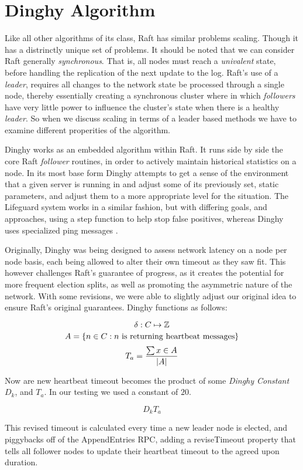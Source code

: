 \section{Dinghy Algorithm}

Like all other algorithms of its class, Raft has similar problems scaling. Though it has a distrinctly unique set of problems. It should be noted that we can consider Raft generally \textit{synchronous}. That is, all nodes must reach a \textit{univalent} state, before handling the replication of the next update to the log. Raft's use of a \textit{leader}, requires all changes to the network state be processed through a single node, thereby essentially creating a synchronous cluster where in which \textit{followers} have very little power to influence the cluster's state when there is a healthy \textit{leader}. So when we discuss scaling in terms of a leader based methods we have to examine different properities of the algorithm.

Dinghy works as an embedded algorithm within Raft. It runs side by side the core Raft \textit{follower} routines, in order to actively maintain historical statistics on a node. In its most base form Dinghy attempts to get a sense of the environment that a given server is running in and adjust some of its previously set, static parameters, and adjust them to a more appropriate level for the situation. The Lifeguard system works in a similar fashion, but with differing goals, and approaches, using a step function to help stop false positives, whereas Dinghy uses specialized ping messages \cite{Lifeguard}.

Originally, Dinghy was being designed to assess network latency on a node per node basis, each being allowed to alter their own timeout as they saw fit. This however challenges Raft’s guarantee of progress, as it creates the potential for more frequent election splits, as well as promoting the asymmetric nature of the network. With some revisions, we were able to slightly adjust our original idea to ensure Raft’s original guarantees. Dinghy functions as follows:

\[\delta: C \mapsto \mathbb{Z}\\\]
\[A=\{n \in C: n \text{ is returning heartbeat messages}\}\\\]
\[T_{a}=\frac{\sum{x \in A}}{\left|A\right|}\\\]

Now are new heartbeat timeout becomes the product of some \textit{Dinghy Constant} $D_{k}$, and $T_{a}$. In our testing we used a constant of $20$.

\[D_{k}T_{a}\]

This revised timeout is calculated every time a new leader node is elected, and piggybacks off of the AppendEntries RPC, adding a reviseTimeout property that tells all follower nodes to update their heartbeat timeout to the agreed upon duration.
